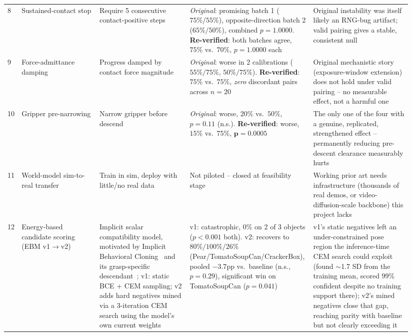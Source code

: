 \documentclass[journal]{IEEEtran}
\begin{document}
\begin{table}[t]
\begin{tabular}{@{}p{0.02\linewidth}p{0.19\linewidth}p{0.22\linewidth}p{0.27\linewidth}p{0.24\linewidth}@{}}
8 & Sustained-contact stop & Require 5 consecutive contact-positive steps & \emph{Original}: promising batch 1 ($75\%/55\%$), opposite-direction batch 2 ($65\%/50\%$), combined $p{=}1.0000$. \textbf{Re-verified}: both batches agree, $75\%$ vs.\ $70\%$, $p{=}1.0000$ each & Original instability was itself likely an RNG-bug artifact; valid pairing gives a stable, consistent null \\
9 & Force-admittance damping & Progress damped by contact force magnitude & \emph{Original}: worse in 2 calibrations ($55\%/75\%$, $50\%/75\%$). \textbf{Re-verified}: $75\%$ vs.\ $75\%$, \emph{zero} discordant pairs across $n{=}20$ & Original mechanistic story (exposure-window extension) does not hold under valid pairing -- no measurable effect, not a harmful one \\
10 & Gripper pre-narrowing & Narrow gripper before descend & \emph{Original}: worse, $20\%$ vs.\ $50\%$, $p{=}0.11$ (n.s.). \textbf{Re-verified}: worse, $15\%$ vs.\ $75\%$, $\mathbf{p{=}0.0005}$ & The only one of the four with a genuine, replicated, strengthened effect -- permanently reducing pre-descent clearance measurably hurts \\
11 & World-model sim-to-real transfer & Train in sim, deploy with little/no real data & Not piloted -- closed at feasibility stage & Working prior art needs infrastructure (thousands of real demos, or video-diffusion-scale backbone) this project lacks \\
12 & Energy-based candidate scoring (EBM v1$\to$v2) & Implicit scalar compatibility model, motivated by Implicit Behavioral Cloning~\cite{florence2021implicit} and its grasp-specific descendant~\cite{singh2024cgdf}; v1: static BCE + CEM sampling; v2 adds hard negatives mined via a 3-iteration CEM search using the model's own current weights & v1: catastrophic, $0\%$ on 2 of 3 objects ($p{<}0.001$ both). v2: recovers to $80\%/100\%/26\%$ (Pear/TomatoSoupCan/CrackerBox), pooled $-3.7$pp vs.\ baseline (n.s., $p{=}0.29$), significant win on TomatoSoupCan ($p{=}0.041$) & v1's static negatives left an under-constrained pose region the inference-time CEM search could exploit (found $\sim$1.7 SD from the training mean, scored $99\%$ confident despite no training support there); v2's mined negatives close that gap, reaching parity with baseline but not clearly exceeding it \\
\bottomrule
\end{tabular}
\end{table}
\end{document}
